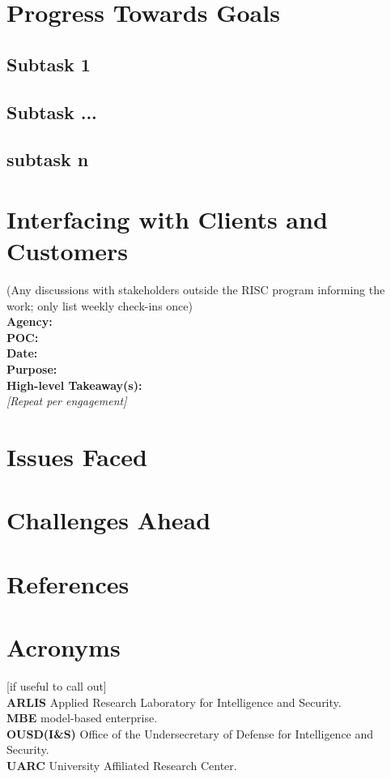 \documentclass[letterpaper, 10pt]{article}
\begin{document}
\begin{multicols}{2}
    \section{Progress Towards Goals}
        \subsection{Subtask 1}
            \lipsum[5]
        \subsection{Subtask ...}
            \lipsum[6]
        \subsection{subtask n}
            \lipsum[7]
    \section{Interfacing with Clients and Customers}
        (Any discussions with stakeholders outside the RISC  program informing the work; only list weekly check-ins  once) \\
        \textbf{Agency:} \\  
        \textbf{POC:}  \\
        \textbf{Date:} \\
        \textbf{Purpose:} \\
        \textbf{High-level Takeaway(s):} \\ 
        \textit{[Repeat per engagement]} 

    \section{Issues Faced}
        \lipsum[8]
    \section{Challenges Ahead}
        \lipsum[9]
    \section{References}
        \printbibliography[heading=none]

    \section{Acronyms}
        [if useful to call out] \\
        \textbf{ARLIS} Applied Research Laboratory for Intelligence and Security.\\ 
        \textbf{MBE} model-based enterprise. \\
        \textbf{OUSD(I\&S)} Office of the Undersecretary of Defense for  Intelligence and Security. \\
        \textbf{UARC} University Affiliated Research Center.\\
    \end{multicols}
    \newpage
\end{document}
